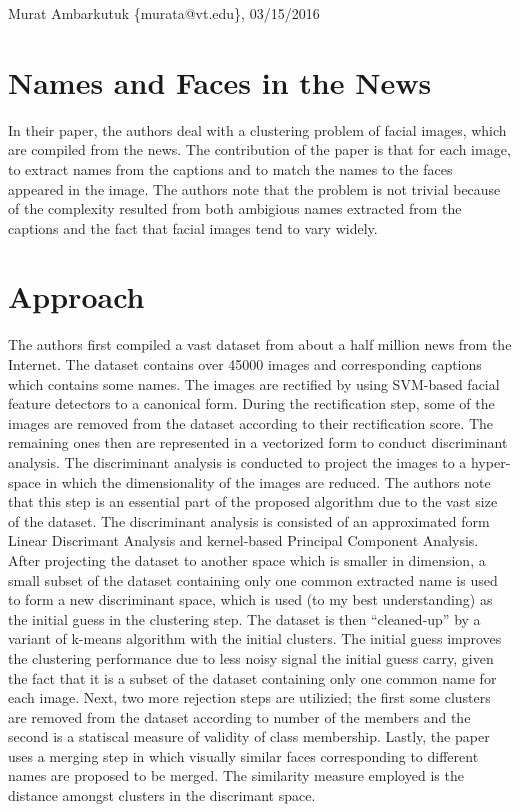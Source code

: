 \documentclass[11pt]{article}
\begin{document}
\thispagestyle{empty}
\begin{flushright}
	\small{Murat Ambarkutuk \{murata@vt.edu\}, 03/15/2016}
\end{flushright}
\section{Names and Faces in the News}
In their paper, the authors deal with a clustering problem of facial images, which are compiled from the news.
The contribution of the paper is that for each image, to extract names from the captions and to match the names to the faces appeared in the image.
The authors note that the problem is not trivial because of the complexity resulted from both ambigious names extracted from the captions and the fact that facial images tend to vary widely.
\section{Approach}
The authors first compiled a vast dataset from about a half million news from the Internet.
The dataset contains over 45000 images and corresponding captions which contains some names.
The images are rectified by using SVM-based facial feature detectors to a canonical form.
During the rectification step, some of the images are removed from the dataset according to their rectification score.
The remaining ones then are represented in a vectorized form to conduct discriminant analysis.
The discriminant analysis is conducted to project the images to a hyper-space in which the dimensionality of the images are reduced.
The authors note that this step is an essential part of the proposed algorithm due to the vast size of the dataset.
The discriminant analysis is consisted of an approximated form Linear Discrimant Analysis and kernel-based Principal Component Analysis.
After projecting the dataset to another space which is smaller in dimension, a small subset of the dataset containing only one common extracted name is used to form a new discriminant space, which is used (to my best understanding) as the initial guess in the clustering step.
The dataset is then ``cleaned-up'' by a variant of k-means algorithm with the initial clusters.
The initial guess improves the clustering performance due to less noisy signal the initial guess carry, given the fact that it is a subset of the dataset containing only one common name for each image.
Next, two more rejection steps are utilizied; the first some clusters are removed from the dataset according to number of the members and the second is a statiscal measure of validity of class membership.
Lastly, the paper uses a merging step in which visually similar faces corresponding to different names are proposed to be merged.
The similarity measure employed is the distance amongst clusters in the discrimant space.
\end{document}
